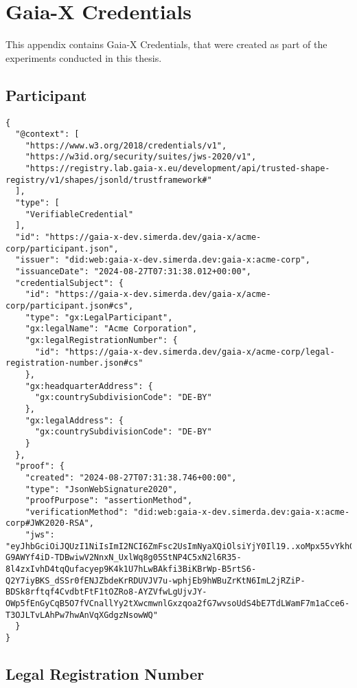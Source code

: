 \chapter{Gaia-X Credentials}\label{ch:appendix-credentials}

This appendix contains Gaia-X Credentials, that were created as part of the experiments conducted in this thesis.

\section{Participant}

\begin{verbatim}
{
  "@context": [
    "https://www.w3.org/2018/credentials/v1",
    "https://w3id.org/security/suites/jws-2020/v1",
    "https://registry.lab.gaia-x.eu/development/api/trusted-shape-registry/v1/shapes/jsonld/trustframework#"
  ],
  "type": [
    "VerifiableCredential"
  ],
  "id": "https://gaia-x-dev.simerda.dev/gaia-x/acme-corp/participant.json",
  "issuer": "did:web:gaia-x-dev.simerda.dev:gaia-x:acme-corp",
  "issuanceDate": "2024-08-27T07:31:38.012+00:00",
  "credentialSubject": {
    "id": "https://gaia-x-dev.simerda.dev/gaia-x/acme-corp/participant.json#cs",
    "type": "gx:LegalParticipant",
    "gx:legalName": "Acme Corporation",
    "gx:legalRegistrationNumber": {
      "id": "https://gaia-x-dev.simerda.dev/gaia-x/acme-corp/legal-registration-number.json#cs"
    },
    "gx:headquarterAddress": {
      "gx:countrySubdivisionCode": "DE-BY"
    },
    "gx:legalAddress": {
      "gx:countrySubdivisionCode": "DE-BY"
    }
  },
  "proof": {
    "created": "2024-08-27T07:31:38.746+00:00",
    "type": "JsonWebSignature2020",
    "proofPurpose": "assertionMethod",
    "verificationMethod": "did:web:gaia-x-dev.simerda.dev:gaia-x:acme-corp#JWK2020-RSA",
    "jws": "eyJhbGciOiJQUzI1NiIsImI2NCI6ZmFsc2UsImNyaXQiOlsiYjY0Il19..xoMpx55vYkhGFn3iRJInsxidCMmcnWi8DbX4L4DK-G9AWYf4iD-TDBwiwV2NnxN_UxlWq8g05StNP4C5xN2l6R35-8l4zxIvhD4tqQufacyep9K4k1U7hLwBAkfi3BiKBrWp-B5rtS6-Q2Y7iyBKS_dSSr0fENJZbdeKrRDUVJV7u-wphjEb9hWBuZrKtN6ImL2jRZiP-BDSk8rftqf4CvdbtFtF1tOZRo8-AYZVfwLgUjvJY-OWp5fEnGyCqB5O7fVCnallYy2tXwcmwnlGxzqoa2fG7wvsoUdS4bE7TdLWamF7m1aCce6-T3OJLTvLAhPw7hwAnVqXGdgzNsowWQ"
  }
}
\end{verbatim}

\section{Legal Registration Number}

